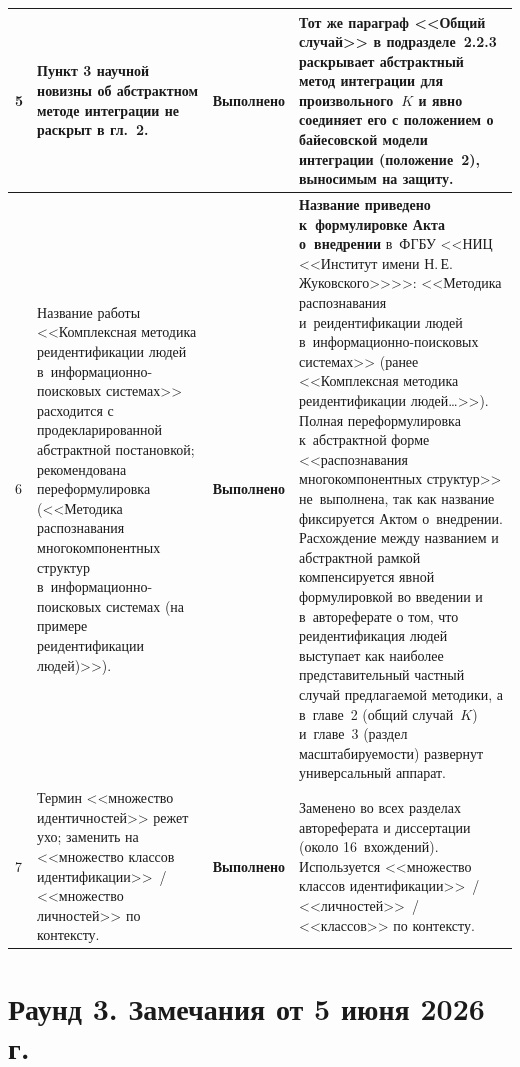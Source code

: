 \documentclass[a4paper,11pt]{article}
\newcommand{\statusDone}{{\color{statusDone}\textbf{Выполнено}}}
\begin{document}
\begin{longtable}{@{}p{}p{}p{}p{}@{}}
5 & Пункт 3 научной новизны об абстрактном методе интеграции не раскрыт в гл.~2.
& \statusDone
& Тот же параграф <<Общий случай>> в подразделе~2.2.3 раскрывает абстрактный метод интеграции для произвольного~$K$ и явно соединяет его с положением о байесовской модели интеграции (положение~2), выносимым на защиту.\\
\midrule

6 & Название работы <<Комплексная методика реидентификации людей в~информационно-поисковых системах>> расходится с продекларированной абстрактной постановкой; рекомендована переформулировка (<<Методика распознавания многокомпонентных структур в~информационно-поисковых системах (на примере реидентификации людей)>>).
& \statusDone
& \textbf{Название приведено к~формулировке Акта о~внедрении} в~ФГБУ <<НИЦ <<Институт имени Н.\,Е.\,Жуковского>>>>: <<Методика распознавания и~реидентификации людей в~информационно-поисковых системах>> (ранее <<Комплексная методика реидентификации людей\ldots>>). Полная переформулировка к~абстрактной форме <<распознавания многокомпонентных структур>> не~выполнена, так как название фиксируется Актом о~внедрении. Расхождение между названием и абстрактной рамкой компенсируется явной формулировкой во введении и в~автореферате о том, что реидентификация людей выступает как наиболее представительный частный случай предлагаемой методики, а в~главе~2 (общий случай~$K$) и~главе~3 (раздел масштабируемости) развернут универсальный аппарат.\\
\midrule

7 & Термин <<множество идентичностей>> режет ухо; заменить на <<множество классов идентификации>>~/ <<множество личностей>> по контексту.
& \statusDone
& Заменено во всех разделах автореферата и диссертации (около 16~вхождений). Используется <<множество классов идентификации>>~/ <<личностей>>~/ <<классов>> по контексту.\\
\end{longtable}

\vspace{4pt}

\section*{Раунд 3. Замечания от 5 июня 2026 г.}
\end{document}
